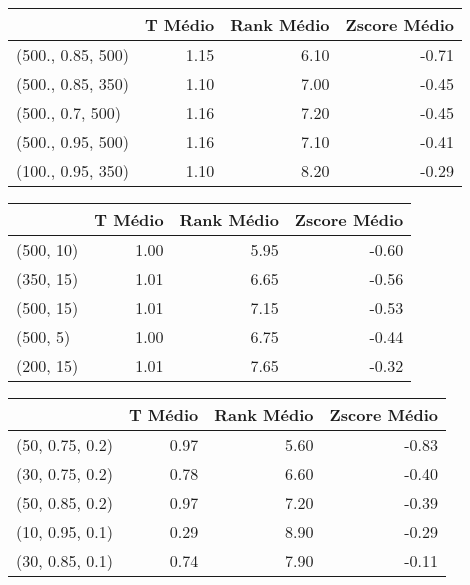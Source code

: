 \begin{table}
\centering
\label{tab:train_5_bests_Simulat}
\begin{tabular}{lrrr}
\toprule
{} &  T Médio &  Rank Médio &  Zscore Médio \\
\midrule
(500., 0.85, 500) &     1.15 &        6.10 &         -0.71 \\
(500., 0.85, 350) &     1.10 &        7.00 &         -0.45 \\
(500., 0.7, 500)  &     1.16 &        7.20 &         -0.45 \\
(500., 0.95, 500) &     1.16 &        7.10 &         -0.41 \\
(100., 0.95, 350) &     1.10 &        8.20 &         -0.29 \\
\bottomrule
\end{tabular}
\end{table}
\begin{table}
\centering
\label{tab:train_5_bests_GRASP}
\begin{tabular}{lrrr}
\toprule
{} &  T Médio &  Rank Médio &  Zscore Médio \\
\midrule
(500, 10) &     1.00 &        5.95 &         -0.60 \\
(350, 15) &     1.01 &        6.65 &         -0.56 \\
(500, 15) &     1.01 &        7.15 &         -0.53 \\
(500, 5)  &     1.00 &        6.75 &         -0.44 \\
(200, 15) &     1.01 &        7.65 &         -0.32 \\
\bottomrule
\end{tabular}
\end{table}
\begin{table}
\centering
\label{tab:train_5_bests_Genetic}
\begin{tabular}{lrrr}
\toprule
{} &  T Médio &  Rank Médio &  Zscore Médio \\
\midrule
(50, 0.75, 0.2) &     0.97 &        5.60 &         -0.83 \\
(30, 0.75, 0.2) &     0.78 &        6.60 &         -0.40 \\
(50, 0.85, 0.2) &     0.97 &        7.20 &         -0.39 \\
(10, 0.95, 0.1) &     0.29 &        8.90 &         -0.29 \\
(30, 0.85, 0.1) &     0.74 &        7.90 &         -0.11 \\
\bottomrule
\end{tabular}
\end{table}
